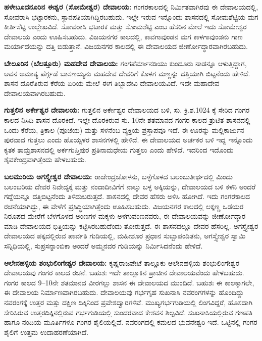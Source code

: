 \textbf{ಹಳೇಬೂದನೂರಿನ ಈಶ್ವರ (ಸೋಮೇಶ್ವರ) ದೇವಾಲಯ:} ಗಂಗರಕಾಲದಲ್ಲಿ ನಿರ್ಮಿತವಾಗಿರವು ಈ ದೇವಾಲಯದಲ್ಲಿ, ಸೋವರಾಸಿ ಭಟ್ಟಾರಕನು, ಸ್ಥಾನಪತಿಯಾಗಿದ್ದಿರಬಹುದು. ಇಲ್ಲೇ ಇರುವ ಇನ್ನೊಂದು ಶಾಸನದಲ್ಲಿ ಸೋಮಶೆಟ್ಟಿಯ ಮಗ ಕೀರ್ತಿಸೆಟ್ಟಿ ಉಲ್ಲೇಖವಿದೆ. ಸೋವರಾಸಿ ಭಟಾರಕ ಮತ್ತು ಸೋಮಶೆಟ್ಟಿ ಎಂಬ ಹೆಸರಿನ ಮೇಲೆ ಇದು ಸೋಮೇಶ್ವರ ದೇವಾಲಯ ಎಂದು ಊಹಿಸಬಹುದು. ವಿಜಯನಗರ ಕಾಲದಲ್ಲಿ, ಕಾವಗಾವುಂಡನ ಮಗ ಕಾಳಗಾವುಂಡನು ಗಾಣ ಮರ್ಯಾದೆಯನ್ನು ದತ್ತಿ ಬಿಡುತ್ತಾನೆ. ವಿಜಯನಗರ ಕಾಲದಲ್ಲಿ ಈ ದೇವಾಲಯದ ಜೀರ್ಣೋದ್ಧಾರವಾಗಿರಬಹುದು.

\textbf{ಬೇಲೂರಿನ (ಬೆಲತ್ತೂರು) ಮಹದೇವ ದೇವಾಲಯ:} ಗಂಗಪೆರ್ಮಾನಡಿಯು ಕುಂದೂರು ನಾಡನ್ನೂ ಆಳುತ್ತಿದ್ದಾಗ, ಅವನ ಅಮಾತ್ಯ ಪೆರ್ಗ್ಗಡೆ ಬಾಸಣಯ್ಯನು ಮಹದೇವ ದೇವರಿಗೆ ಕೊಳಗ ಮಣ್ಣನ್ನು ದತ್ತಿಯಾಗಿ ಬಿಟ್ಟನೆಂದು ಹೇಳಿದೆ. ಶಾಸನ ದೊರೆತಿರುವ ಕೆರೆಯ ಏರಿಯ ಮೇಲೆ ಈಗ ತಿಬ್ಬಾದೇವಿ ದೇವಾಲಯವಿದೆ. ಇದೇ ಮಹಾದೇವ ದೇವಾಲಯವಾಗಿರಬಹುದು.

\textbf{ಗುತ್ತಲಿನ ಅರ್ಕೇಶ್ವರ ದೇವಾಲಯ:} ಗುತ್ತಲಿನ ಅರ್ಕೇಶ್ವರ ದೇವಾಲಯದ ಬಳಿ, ಸು. ಕ್ರಿ.ಶ.1024 ಕ್ಕೆ ಸೇರಿದ ಗಂಗರ ಕಾಲದ ನಿಸಿದಿ ಶಾಸನ ದೊರಕಿದೆ. ಇಲ್ಲೇ ದೊರಕಿರುವ ಸು. 10ನೇ ಶತಮಾನದ ಗಂಗರ ಕಾಲದ ತ್ರುಟಿತ ಶಾಸನದಲ್ಲಿ ಒಂದು ಕೆರೆಯ, ತ್ರಿಕಾಲ (ಪೂಜೆಯ) ಮತ್ತು ಸಳನೆಂಬ ವ್ಯಕ್ತಿಯ ಪ್ರಸ್ತಾಪವೂ ಇದೆ. ಈ ಊರನ್ನು ಮಲ್ಲಿಕಾರ್ಜುನ ಪುರವಾದ ಗುತ್ತಲು ಎಂದು ಹೊಯ್ಸಳರ ಶಾಸನಗಳಲ್ಲಿ ಹೇಳಿದೆ. ಈ ದೇವಾಲಯದ ಅರ್ಚಕರ ಬಳಿ ಇದ್ದ ಇನ್ನೊಂದು ಕೃತಕ ತಾಮ್ರಶಾಸನದಲ್ಲಿ ಅರ್ಕಗುಪ್ತಿಪುರ ಪ್ರತಿನಾಮಧೇಯ ಗುತ್ತಲು ಎಂದು ಹೇಳಿದೆ. ಇದರಿಂದ ಇದೊಂದು ಶೈವಕೇಂದ್ರವಾಗಿತ್ತೆಂದು ಹೇಳಬಹುದು.

\textbf{ಬಲಮುರಿಯ ಅಗಸ್ತ್ಯೇಶ್ವರ ದೇವಾಲಯ:} ರಾಜೇಂದ್ರಚೋಳನು, ಬಳ್ಳೆಗೊಳದ ಬಲಂಬುತೀರ್ಥದಲ್ಲಿ ಮಿಂದು ಬಲಂಬರಿಯ ದೇವರ ನಿವೇದ್ಯಕ್ಕೆ ಮತ್ತು ನಂದಾದೀವಿಗೆಗೆ ನಾಲ್ಕು ಬಳ್ಳ ಅಕ್ಕಿಯನ್ನು, ದೇವಾಲಯದ ಬಳಿ ಕಳನಿ ಅಂದರೆ ಗದ್ದೆಯನ್ನೂ ದತ್ತಿಬಿಟ್ಟನೆಂದು ತಿಳಿದುಬರುತ್ತದೆ. ಶಾಸನದಲ್ಲಿ ದೇವರ ಹೆಸರು ಅಳಿಸಿ ಹೋಗಿದೆ. ಇದು ಗಂಗರಕಾಲದ ರಚನೆಯಾಗಿದ್ದು, ಈ ವೇಳೆಗೆ ಪ್ರಸಿದ್ಧಿಯಾಗಿತ್ತೆಂದು ಊಹಿಸಬಹುದು. ವಿಜಯನಗರ ಕಾಲದಲ್ಲಿ ಲಕ್ಕಣ್ಣ ಒಡೆಯರ ನಿರೂಪದ ಮೇರೆಗೆ ಬೆಳಗೊಳದ ಅಂಣಗಳ ಮಕ್ಕಳು ಅಳಗುವಂಣನವರು, ಈ ದೇವಾಲಯವನ್ನು ಜೀರ್ಣೋದ್ಧಾರ ಮಾಡಿ ದೇವಾಲಯದ ಭಿತ್ತಿಯನ್ನು ಕಟ್ಟಿಸಿರಬಹುದೆಂದು ತೋರುತ್ತದೆ. ಈ ಶಾಸನದಲ್ಲೂ ದೇವರ ಹೆಸರಿಲ್ಲ. ಅಗಸ್ತ್ಯೇಶ್ವರ ದೇವಾಲಯದ ಪಕ್ಕದಲ್ಲಿರುವ ಪಾರ್ವತಿ ಗುಡಿಯಲ್ಲಿ, ಮಹೀಶೂರ ಪ್ರಧಾನ ಸುಬ್ಬಾಪಂಡಿತನು, ಅಗಸ್ತ್ಯೇಶ್ವರ ಸ್ವಾಮಿ ಸನ್ನಿಧಿಯಲ್ಲಿ, ಸುಪ್ರಸನ್ನಾಂಬಿಕಾ ಅಂದರೆ ಅಮ್ಮನವರ ಗುಡಿಯನ್ನು ನಿರ್ಮಿಸಿದನೆಂದು ಹೇಳಿದೆ.

\textbf{ಆಲೇನಹಳ್ಳಿಯ ಶಂಭುಲಿಂಗೇಶ್ವರ ದೇವಾಲಯ:} ಕೃಷ್ಣರಾಜಪೇಟೆ ತಾಲ್ಲೂಕು ಆಲೇನಹಳ್ಳಿಯ ಶಂಭುಲಿಂಗೇಶ್ವರ ದೇವಾಲಯವು ಗಂಗರ ಕಾಲದ ರಚನೆ. ಬಹುಶಃ ಇದೇ ತಾಲ್ಲೂಕಿನ ಪ್ರಾಚೀನ ದೇವಾಲಯವೆಂದು ಹೇಳಬಹುದು. ಗಂಗರ ಕಾಲದ 9–10ನೇ ಶತಮಾನದ ವೀರಗಲ್ಲು ಶಾಸನ ಈ ದೇವಾಲಯದ ಮುಂದಿದೆ. ಬಹುಶಃ ಈ ಕಾಲಕ್ಕಾಗಲೇ, ಈ ದೇವಾಲಯ ನಿರ್ಮಾಣವಾಗಿರಬಹುದು. ದೇವಾಲಯವು ಗರ್ಭಗೃಹ ಸುಖನಾಸಿ ನವರಂಗಗಳನ್ನು ಹೊಂದಿದ್ದು ನವರಂಗಕ್ಕೆ ಉತ್ತರ ಮತ್ತು ದಕ್ಷಿಣ ದಿಕ್ಕಿನಿಂದ ಪ್ರವೇಶದ್ವಾರಗಳಿವೆ. ಮುಖ್ಯಗರ್ಭಗುಡಿಯಲ್ಲಿ ಲಿಂಗವಿದ್ದರೆ, ಹೊಸದಾಗಿ ಸೇರಿಸಿರುವ ಉತ್ತರದಿಕ್ಕಿನಲ್ಲಿರುವ ಗರ್ಭಗುಡಿಯಲ್ಲಿ ಸುಂದರವಾದ ಕೇಶವನ ಶಿಲ್ಪವಿದೆ. ಸುಖನಾಸಿಯಲ್ಲಿರುವ ಗಣಪತಿ ಹಾಗೂ ನಂದಿಯ ಮೂರ್ತಿಗಳೂ ಗಂಗರ ಶೈಲಿಯಲ್ಲಿವೆ. ನವರಂಗದಲ್ಲಿ ಕಮಲದ ಭುವನೇಶ್ವರಿ ಇದೆ. ಒಟ್ಟಿನಲ್ಲಿ ಗಂಗರ ಶೈಲಿಗೆ ಉತ್ತಮ ಉದಾಹರಣೆಯಾಗಿದೆ.

